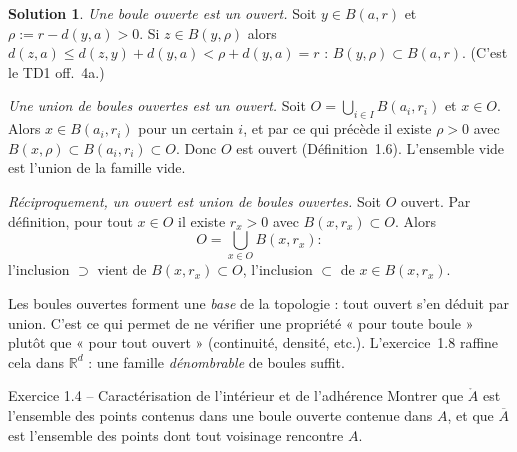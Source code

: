 \documentclass[11pt,a4paper]{article}
\newcommand{\R}{\mathbb{R}}
\newcommand{\interieur}[1]{\mathring{#1}}
\newcommand{\adh}[1]{\overline{#1}}
\theoremstyle{definition}
\newtheorem*{solution}{Solution}
\begin{document}
\begin{solution}
\emph{Une boule ouverte est un ouvert.} Soit $y\in B(a,r)$ et $\rho:=r-d(y,a)>0$. Si $z\in B(y,\rho)$ alors $d(z,a)\le d(z,y)+d(y,a)<\rho+d(y,a)=r$ : $B(y,\rho)\subset B(a,r)$. (C'est le TD1 off.~4a.)

\emph{Une union de boules ouvertes est un ouvert.} Soit $O=\bigcup_{i\in I}B(a_i,r_i)$ et $x\in O$. Alors $x\in B(a_i,r_i)$ pour un certain $i$, et par ce qui précède il existe $\rho>0$ avec $B(x,\rho)\subset B(a_i,r_i)\subset O$. Donc $O$ est ouvert (Définition~1.6). L'ensemble vide est l'union de la famille vide.

\emph{Réciproquement, un ouvert est union de boules ouvertes.} Soit $O$ ouvert. Par définition, pour tout $x\in O$ il existe $r_x>0$ avec $B(x,r_x)\subset O$. Alors
\[
O=\bigcup_{x\in O}B(x,r_x):
\]
l'inclusion $\supset$ vient de $B(x,r_x)\subset O$, l'inclusion $\subset$ de $x\in B(x,r_x)$.
\end{solution}

\begin{pointcle}
Les boules ouvertes forment une \emph{base} de la topologie : tout ouvert s'en déduit par union. C'est ce qui permet de ne vérifier une propriété « pour toute boule » plutôt que « pour tout ouvert » (continuité, densité, etc.). L'exercice~1.8 raffine cela dans $\R^d$ : une famille \emph{dénombrable} de boules suffit.
\end{pointcle}

\begin{exo}{Exercice 1.4 -- Caractérisation de l'intérieur et de l'adhérence}
Montrer que $\interieur A$ est l'ensemble des points contenus dans une boule ouverte contenue dans $A$, et que $\adh A$ est l'ensemble des points dont tout voisinage rencontre $A$.
\end{exo}
\end{document}
